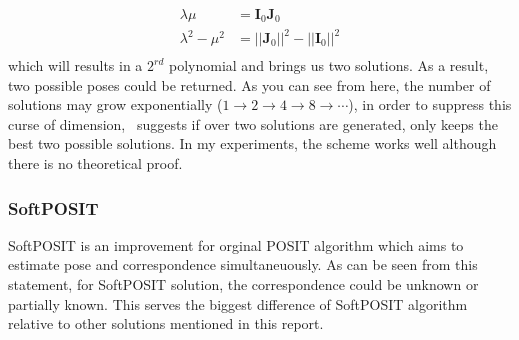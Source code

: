 \documentclass[a4paper]{report}
\begin{document}
\begin{align*}
\lambda \mu &= \mathbf{I}_0\mathbf{J}_0 \\
\lambda^2 -\mu^2 &= ||\mathbf{J}_0||^2-||\mathbf{I}_0||^2 \\
\end{align*}
which will results in a $2^{rd}$ polynomial and brings us two solutions. As a result, two possible poses could be returned. As you can see from here, the number of solutions may grow exponentially ($1 \to 2 \to 4 \to 8 \to \cdots$), in order to suppress this curse of dimension,~\cite{oberkampf1996iterative} suggests if over two solutions are generated, only keeps the best two possible solutions. In my experiments, the scheme works well although there is no theoretical proof.
\subsubsection{SoftPOSIT}
SoftPOSIT is an improvement for orginal POSIT algorithm which aims to estimate pose and correspondence simultaneuously. As can be seen from this statement, for SoftPOSIT solution, the correspondence could be unknown or partially known. This serves the biggest difference of SoftPOSIT algorithm relative to other solutions mentioned in this report.
\end{document}

